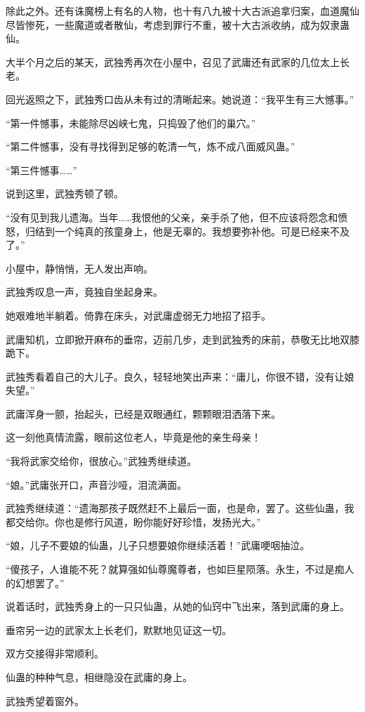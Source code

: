 \begin{this_body}
除此之外。还有诛魔榜上有名的人物，也十有八九被十大古派追拿归案，血道魔仙尽皆惨死，一些魔道或者散仙，考虑到罪行不重，被十大古派收纳，成为奴隶蛊仙。

大半个月之后的某天，武独秀再次在小屋中，召见了武庸还有武家的几位太上长老。

回光返照之下，武独秀口齿从未有过的清晰起来。她说道：“我平生有三大憾事。”

“第一件憾事，未能除尽凶峡七鬼，只捣毁了他们的巢穴。”

“第二件憾事，没有寻找得到足够的乾清一气，炼不成八面威风蛊。”

“第三件憾事……”

说到这里，武独秀顿了顿。

“没有见到我儿遗海。当年……我恨他的父亲，亲手杀了他，但不应该将怨念和愤怒，归结到一个纯真的孩童身上，他是无辜的。我想要弥补他。可是已经来不及了。”

小屋中，静悄悄，无人发出声响。

武独秀叹息一声，竟独自坐起身来。

她艰难地半躺着。倚靠在床头，对武庸虚弱无力地招了招手。

武庸知机，立即掀开麻布的垂帘，迈前几步，走到武独秀的床前，恭敬无比地双膝跪下。

武独秀看着自己的大儿子。良久，轻轻地笑出声来：“庸儿，你很不错，没有让娘失望。”

武庸浑身一颤，抬起头，已经是双眼通红，颗颗眼泪洒落下来。

这一刻他真情流露，眼前这位老人，毕竟是他的亲生母亲！

“我将武家交给你，很放心。”武独秀继续道。

“娘。”武庸张开口，声音沙哑，泪流满面。

武独秀继续道：“遗海那孩子既然赶不上最后一面，也是命，罢了。这些仙蛊，我都交给你。你也是修行风道，盼你能好好珍惜，发扬光大。”

“娘，儿子不要娘的仙蛊，儿子只想要娘你继续活着！”武庸哽咽抽泣。

“傻孩子，人谁能不死？就算强如仙尊魔尊者，也如巨星陨落。永生，不过是痴人的幻想罢了。”

说着话时，武独秀身上的一只只仙蛊，从她的仙窍中飞出来，落到武庸的身上。

垂帘另一边的武家太上长老们，默默地见证这一切。

双方交接得非常顺利。

仙蛊的种种气息，相继隐没在武庸的身上。

武独秀望着窗外。


\end{this_body}
